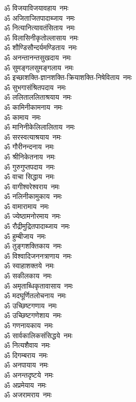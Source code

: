 \begin{multicols}{2}
\begin{flushleft}
ॐ विजयाविजयावहाय~नमः\hfill{}\\
ॐ अजिताजितपादाब्जाय~नमः\\
ॐ नित्यानित्यावतंसिताय~नमः\\
ॐ विलासिनीकृतोल्लासाय~नमः\\
ॐ शौण्डिसौन्दर्यमण्डिताय~नमः\\
ॐ अनन्तानन्तसुखदाय~नमः\\
ॐ सुमङ्गलसुमङ्गलाय~नमः\\
ॐ इच्छाशक्ति-ज्ञानशक्ति-क्रियाशक्ति-निषेविताय~नमः\\
ॐ सुभगासंश्रितपदाय~नमः\\
ॐ ललिताललिताश्रयाय~नमः\\
ॐ कामिनीकामनाय~नमः\hfill{}\\
ॐ कामाय~नमः\\
ॐ मानिनीकेलिलालिताय~नमः\\
ॐ सरस्वत्याश्रयाय~नमः\\
ॐ गौरीनन्दनाय~नमः\\
ॐ श्रीनिकेतनाय~नमः\\
ॐ गुरुगुप्तपदाय~नमः\\
ॐ वाचा सिद्धाय~नमः\\
ॐ वागीश्वरेश्वराय~नमः\\
ॐ नलिनीकामुकाय~नमः\\
ॐ वामारामाय~नमः\hfill{}\\
ॐ ज्येष्ठामनोरमाय~नमः\\
ॐ रौद्रीमुद्रितपादाब्जाय~नमः\\
ॐ हुम्बीजाय~नमः\\
ॐ तुङ्गशक्तिकाय~नमः\\
ॐ विश्वादिजननत्राणाय~नमः\\
ॐ स्वाहाशक्तये~नमः\\
ॐ सकीलकाय~नमः\\
ॐ अमृताब्धिकृतावासाय~नमः\\
ॐ मदघूर्णितलोचनाय~नमः\\
ॐ उच्छिष्टगणाय~नमः\hfill{}\\
ॐ उच्छिष्टगणेशाय~नमः\\
ॐ गणनायकाय~नमः\\
ॐ सार्वकालिकसंसिद्धये~नमः\\
ॐ नित्यशैवाय~नमः\\
ॐ दिगम्बराय~नमः\\
ॐ अनपायाय~नमः\\
ॐ अनन्तदृष्टये~नमः\\
ॐ अप्रमेयाय~नमः\\
ॐ अजरामराय~नमः\\

\end{flushleft}
\end{multicols}

